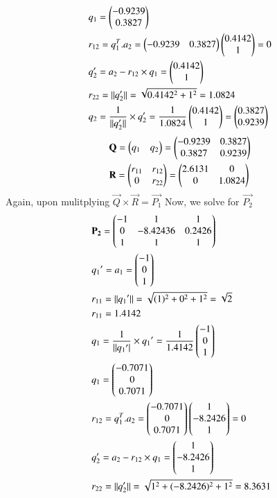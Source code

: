 \documentclass[journal,12pt,twocolumn]{IEEEtran}
\renewcommand\thesection{\arabic{section}}
\begin{document}
\begin{enumerate}[label=\thesection.\arabic*.,ref=\thesection.\theenumi]
\begin{align*}
& q_1=\begin{pmatrix}-0.9239 \\0.3827\end{pmatrix}\\
& r_{12}=q_1^T.a_2=\begin{pmatrix}-0.9239 & 0.3827\end{pmatrix} \begin{pmatrix}0.4142\\ 1\end{pmatrix}=0\\
&q_2'=a_2-r_{12}\times q_1=\begin{pmatrix}0.4142\\ 1\end{pmatrix}\\
& r_{22}=||q_2'||=\sqrt{0.4142^2+1^2}=1.0824\\
& q_2=\frac{1}{||q_2'||}\times q_2'=\frac{1}{1.0824}\begin{pmatrix}0.4142\\ 1\end{pmatrix}=\begin{pmatrix}0.3827\\ 0.9239\end{pmatrix}
\end{align*}
\begin{align*}
&\mathbf{Q}=\begin{pmatrix}q_1 & q_2\end{pmatrix}=\begin{pmatrix}-0.9239 & 0.3827\\0.3827 & 0.9239\end{pmatrix}\\
& \mathbf{R}=\begin{pmatrix}r_{11} & r_{12}\\ 0 & r_{22}\end{pmatrix}=\begin{pmatrix}2.6131 & 0\\ 0 & 1.0824\end{pmatrix}
\end{align*}
Again, upon mulitplying $\vec{Q}\times\vec{R}=\vec{P_1}$
Now, we solve for $\vec{P_2}$
\begin{align*}
& \vec{P_2}=\myvec{-1 & 1 & 1\\0 & -8.42436 & 0.2426\\1 & 1 & 1}\\
& q_1{'}=a_1=\myvec{-1\\0 \\1 }\\
& r_{11}=||q_1{'}||=\sqrt{(1)^2+0^2+1^2}=\sqrt{2}\\\
& r_{11}=1.4142\\
& q_1=\frac{1}{||q_1{'}|}\times q_1{'}=\frac{1}{1.4142}\myvec{-1\\0 \\1 }\\
& q_1=\myvec{-0.7071\\0 \\0.7071 }\\
& r_{12}=q_1^T.a_2=\myvec{-0.7071\\0 \\0.7071 } \myvec{1\\-8.2426\\ 1}=0\\
&q_2'=a_2-r_{12}\times q_1=\myvec{1\\-8.2426\\ 1}\\
& r_{22}=||q_2'||=\sqrt{1^2+(-8.2426)^2+1^2}=8.3631\\

\end{align*}
\end{enumerate}
\end{document}
